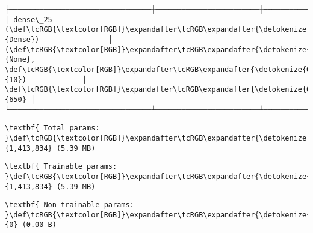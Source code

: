 \documentclass[12pt letter]{report}
\begin{document}
\begin{Verbatim}[commandchars=\\\{\}]
├─────────────────────────────────┼────────────────────────┼───────────────┤
│ dense\_25 (\def\tcRGB{\textcolor[RGB]}\expandafter\tcRGB\expandafter{\detokenize{0,135,255}}{Dense})                │ (\def\tcRGB{\textcolor[RGB]}\expandafter\tcRGB\expandafter{\detokenize{0,215,255}}{None}, \def\tcRGB{\textcolor[RGB]}\expandafter\tcRGB\expandafter{\detokenize{0,175,0}}{10})             │           \def\tcRGB{\textcolor[RGB]}\expandafter\tcRGB\expandafter{\detokenize{0,175,0}}{650} │
└─────────────────────────────────┴────────────────────────┴───────────────┘

    \end{Verbatim}

    
    
    \begin{Verbatim}[commandchars=\\\{\}]
\textbf{ Total params: }\def\tcRGB{\textcolor[RGB]}\expandafter\tcRGB\expandafter{\detokenize{0,175,0}}{1,413,834} (5.39 MB)

    \end{Verbatim}

    
    
    \begin{Verbatim}[commandchars=\\\{\}]
\textbf{ Trainable params: }\def\tcRGB{\textcolor[RGB]}\expandafter\tcRGB\expandafter{\detokenize{0,175,0}}{1,413,834} (5.39 MB)

    \end{Verbatim}

    
    
    \begin{Verbatim}[commandchars=\\\{\}]
\textbf{ Non-trainable params: }\def\tcRGB{\textcolor[RGB]}\expandafter\tcRGB\expandafter{\detokenize{0,175,0}}{0} (0.00 B)

    \end{Verbatim}
\end{document}
